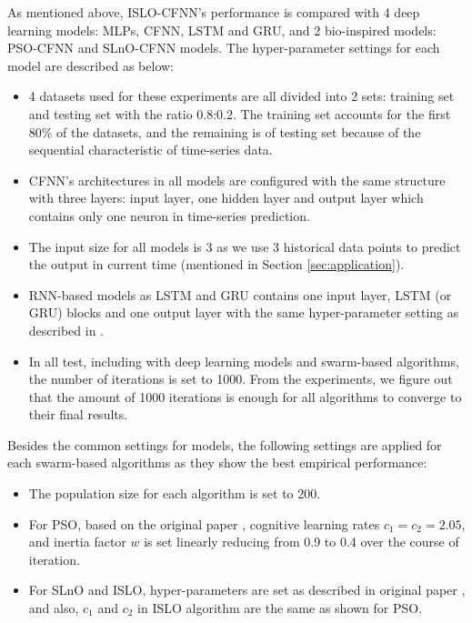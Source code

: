 \documentclass[../main.tex]{subfiles}
\begin{document}
	As mentioned above, ISLO-CFNN's performance is compared with 4 deep learning models: MLPs, CFNN, LSTM and GRU, and 2 bio-inspired models: PSO-CFNN and SLnO-CFNN models. The hyper-parameter settings for each model are described as below:
\begin{itemize}
\item 4 datasets used for these experiments are all divided into 2 sets: training set and testing set with the ratio 0.8:0.2. The training set accounts for the first 80\% of the datasets, and the remaining is of testing set because of the sequential characteristic of time-series data.
\item CFNN's architectures in all models are configured with the same structure with three layers: input layer, one hidden layer and output layer which contains only one neuron in time-series prediction.
\item The input size for all models is 3 as we use 3 historical data points to predict the output in current time (mentioned in Section \ref{sec:application}).
\item RNN-based models as LSTM and GRU contains one input layer, LSTM (or GRU) blocks and one output layer with the same hyper-parameter setting as described in \cite{fu2016using}.
\item In all test, including with deep learning models and swarm-based algorithms, the number of iterations is set to 1000. From the experiments, we figure out that the amount of 1000 iterations is enough for all algorithms to converge to their final results. 
\end{itemize} 

Besides the common settings for models, the following settings are applied for each swarm-based algorithms as they show the best empirical performance:

\begin{itemize}
\item The population size for each algorithm is set to 200.
\item For PSO, based on the original paper \cite{eberhart1995particle}, cognitive learning rates $c_1=c_2=2.05$, and inertia factor $w$ is set linearly reducing from 0.9 to 0.4 over the course of iteration.
\item For SLnO and ISLO, hyper-parameters are set as described in original paper \cite{masadeh2019sea}, and also, $c_1$ and $c_2$ in ISLO algorithm are the same as shown for PSO.
\end{itemize}
\end{document}
